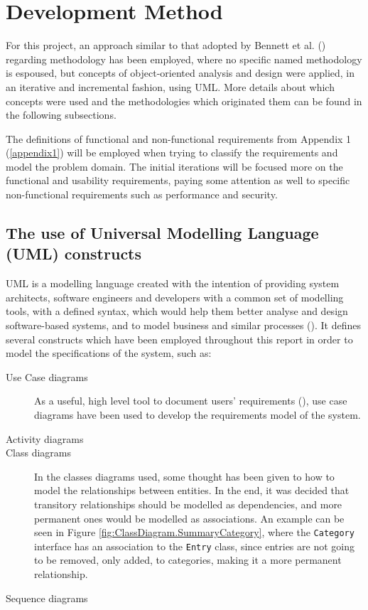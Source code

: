 \section{Development Method} \label{sec:DevelopmentMethod}
For this project, an approach similar to that adopted by Bennett et al.
(\citeyear[][p.~77]{bennett2010object}) regarding methodology has been
employed, where no specific named methodology is espoused, but concepts of
object-oriented analysis and design were applied, in an iterative and
incremental fashion, using UML. More details about which concepts were used and
the methodologies which originated them can be found in the following
subsections.

The definitions of functional and non-functional requirements from Appendix 1
(\ref{appendix1}) will be employed when trying to classify the requirements and
model the problem domain. The initial iterations will be focused more on the
functional and usability requirements, paying some attention as well to
specific non-functional requirements such as performance and security.

\subsection{The use of Universal Modelling Language (UML) constructs}
\label{sec:Introduction.methodology.uml}

UML is a modelling language created with the intention of providing system
architects, software engineers and developers with a common set of modelling
tools, with a defined syntax, which would help them better analyse and design
software-based systems, and to model business and similar processes
(\cite[][p.~43]{omg2015uml}). It defines several constructs which have been
employed throughout this report in order to model the specifications of the
system, such as:
\begin{description}
  \item[Use Case diagrams]
    As a useful, high level tool to document users' requirements
    (\cite[][p.~138]{bennett2010object}), use case diagrams have been used to
    develop the requirements model of the system.

  \item[Activity diagrams]

  \item[Class diagrams]
    In the classes diagrams used, some thought has been given to how to model
    the relationships between entities. In the end, it was decided that
    transitory relationships should be modelled as dependencies, and more
    permanent ones would be modelled as associations. An example can be seen in
    Figure \ref{fig:ClassDiagram.SummaryCategory}, where the \texttt{Category}
    interface has an association to the \texttt{Entry} class, since entries are
    not going to be removed, only added, to categories, making it a more
    permanent relationship.
    
  \item[Sequence diagrams]
\end{description}


